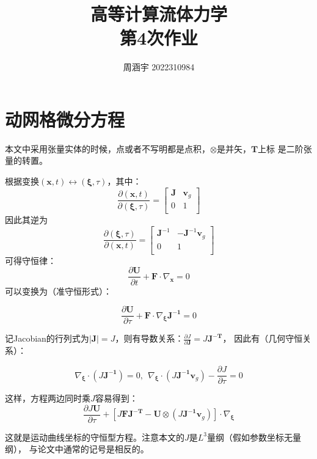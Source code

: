 \documentclass[UTF8,zihao=5]{ctexart} %
\title{{\bfseries\rmfamily\Huge{高等计算流体力学\hspace{1em}\\第4次作业}}}
\author{周涵宇 2022310984}
\date{}
\newcommand{\bm}[1]{{\mathbf{#1}}}
\newcommand*{\pd}[2]{\frac{\partial #1}{\partial #2}}
\newcommand*{\nb}[0]{{\nabla}}
\begin{document}
\maketitle

\section{动网格微分方程}

\newcommand*{\xxii}[0]{\symbf{\xi}}
\newcommand*{\xx}[0]{\symbf{x}}
\newcommand*{\U}[0]{\symbf{U}}
\newcommand*{\F}[0]{\symbf{F}}
\newcommand*{\vg}[0]{\symbf{v}_g}

本文中采用张量实体的时候，点或者不写明都是点积，$\otimes$是并矢，$\bm{T}$上标
是二阶张量的转置。

根据变换$(\xx,t)\leftrightarrow(\xxii,\tau)$，其中：
$$
    \pd{(\xx,t)}{(\xxii,\tau)}=\begin{bmatrix}
        \bm{J} & \vg \\
        0      & 1   \\
    \end{bmatrix}
$$
因此其逆为
$$
    \pd{(\xxii,\tau)}{(\xx,t)}=\begin{bmatrix}
        \bm{J}^{-1} & -\bm{J}^{-1}\vg \\
        0           & 1               \\
    \end{bmatrix}
$$
可得守恒律：
$$
    \pd{\bm{U}}{t}+\F\cdot\nb_{\xx}=0
$$
可以变换为（准守恒形式）：

\begin{equation}
    \pd{\bm{U}}{\tau}+\F\cdot\nb_{\xxii}\bm{J^{-1}}=0
    \label{eq:p_conser}
\end{equation}


记Jacobian的行列式为$|\bm{J}|=J$，则有导数关系：$\pd{J}{\bm{J}}=J\bm{J^{-T}}$，
因此有（几何守恒关系）：

\begin{equation}
    \nb_{\xxii}\cdot(J\bm{J^{-1}})=0,\ \
    \nb_{\xxii}\cdot(J\bm{J^{-1}}\vg)-\pd{J}{\tau}=0
    \label{eq:geom_conser}
\end{equation}

这样，方程两边同时乘$J$容易得到：
\begin{equation}
    \pd{J\U}{\tau}+
    [J\F\bm{J^{-T}} - \bm{U}\otimes(J\bm{J^{-1}}\vg)]\cdot\nb_{\xxii}
    \label{eq:conser}
\end{equation}


这就是运动曲线坐标的守恒型方程。注意本文的$J$是$L^3$量纲（假如参数坐标无量纲），
与论文中通常的记号是相反的。
\end{document}
